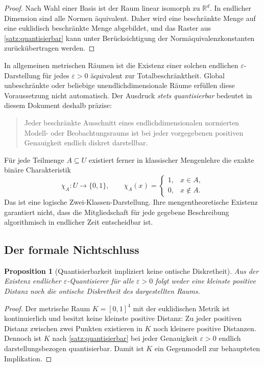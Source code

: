 \documentclass[11pt,a4paper]{article}
\newtheorem{proposition}{Proposition}[section]
\theoremstyle{remark}
\newcommand{\R}{\mathbb{R}}
\newcommand{\eps}{\varepsilon}
\begin{document}
\begin{proof}
Nach Wahl einer Basis ist der Raum linear isomorph zu \(\R^d\). In endlicher
Dimension sind alle Normen äquivalent. Daher wird eine beschränkte Menge auf
eine euklidisch beschränkte Menge abgebildet, und das Raster aus
\cref{satz:quantisierbar} kann unter Berücksichtigung der
Normäquivalenzkonstanten zurückübertragen werden.
\end{proof}

In allgemeinen metrischen Räumen ist die Existenz einer solchen endlichen
\(\eps\)-Darstellung für jedes \(\eps>0\) äquivalent zur
Totalbeschränktheit. Global unbeschränkte oder beliebige
unendlichdimensionale Räume erfüllen diese Voraussetzung nicht automatisch.
Der Ausdruck \emph{stets quantisierbar} bedeutet in diesem Dokument deshalb
präzise:

\begin{quote}
Jeder beschränkte Ausschnitt eines endlichdimensionalen normierten Modell-
oder Beobachtungsraums ist bei jeder vorgegebenen positiven Genauigkeit
endlich diskret darstellbar.
\end{quote}

Für jede Teilmenge \(A\subseteq U\) existiert ferner in klassischer
Mengenlehre die exakte binäre Charakteristik
\[
  \chi_A:U\to\{0,1\},
  \qquad
  \chi_A(x)=
  \begin{cases}
  1,&x\in A,\\
  0,&x\notin A.
  \end{cases}
\]
Das ist eine logische Zwei-Klassen-Darstellung. Ihre mengentheoretische
Existenz garantiert nicht, dass die Mitgliedschaft für jede gegebene
Beschreibung algorithmisch in endlicher Zeit entscheidbar ist.

\subsection{Der formale Nichtschluss}

\begin{proposition}[Quantisierbarkeit impliziert keine ontische Diskretheit]
\label{prop:nichtschluss}
Aus der Existenz endlicher \(\eps\)-Quantisierer für alle
\(\eps>0\) folgt weder eine kleinste positive Distanz noch die ontische
Diskretheit des dargestellten Raums.
\end{proposition}

\begin{proof}
Der metrische Raum \(K=[0,1]^4\) mit der euklidischen Metrik ist kontinuierlich
und besitzt keine kleinste positive Distanz: Zu jeder positiven Distanz
zwischen zwei Punkten existieren in \(K\) noch kleinere positive Distanzen.
Dennoch ist \(K\) nach \cref{satz:quantisierbar} bei jeder Genauigkeit
\(\eps>0\) endlich darstellungsbezogen quantisierbar. Damit ist \(K\) ein
Gegenmodell zur behaupteten Implikation.
\end{proof}
\end{document}
